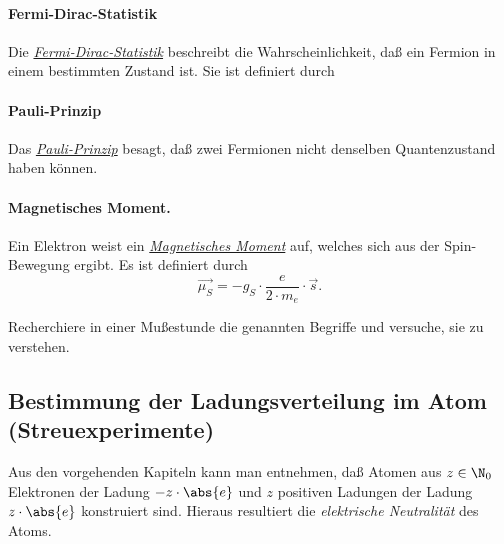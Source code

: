 \documentclass[]{subfiles}
\begin{document}
            \paragraph*{Fermi-Dirac-Statistik} Die \href{https://de.wikipedia.org/wiki/Fermi-Dirac-Statistik}{\emph{Fermi-Dirac-Statistik}} beschreibt die Wahrscheinlichkeit, daß ein Fermion in einem bestimmten Zustand ist. Sie ist definiert durch 

            \paragraph*{Pauli-Prinzip} Das \href{https://de.wikipedia.org/wiki/Pauli-Prinzip}{\emph{Pauli-Prinzip}} besagt, daß zwei Fermionen nicht denselben Quantenzustand haben können.

            \paragraph*{Magnetisches Moment.} Ein Elektron weist ein \href{https://de.wikipedia.org/wiki/Magnetisches_Moment}{\emph{Magnetisches Moment}} auf, welches sich aus der Spin-Bewegung ergibt. Es ist definiert durch
            \[\vec{\mu_S} = -g_S\cdot \frac{e}{2\cdot m_e}\cdot\vec{s}.\]

            \begin{Aufgabe}
                \nr{} Recherchiere in einer Mußestunde die genannten Begriffe und versuche, sie zu verstehen.
            \end{Aufgabe}

    \subsection{Bestimmung der Ladungsverteilung im Atom (Streuexperimente)}
        Aus den vorgehenden Kapiteln kann man entnehmen, daß Atomen aus $z\in\N_0$ Elektronen der Ladung $-z\cdot \abs{e}$ und $z$ positiven Ladungen der Ladung $z\cdot\abs{e}$ konstruiert sind. Hieraus resultiert die \emph{elektrische Neutralität} des Atoms. 
\end{document}
